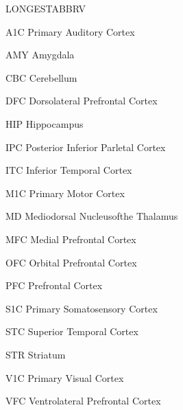 \begin{theglossary}{LONGESTABBRV}

\item[A1C] Primary Auditory Cortex
\item[AMY] Amygdala
\item[CBC] Cerebellum
\item[DFC] Dorsolateral Prefrontal Cortex
\item[HIP] Hippocampus
\item[IPC] Posterior Inferior Parletal Cortex
\item[ITC] Inferior Temporal Cortex
\item[M1C] Primary Motor Cortex
\item[MD] Mediodorsal Nucleusofthe Thalamus
\item[MFC] Medial Prefrontal Cortex
\item[OFC] Orbital Prefrontal Cortex
\item[PFC] Prefrontal Cortex
\item[S1C] Primary Somatosensory Cortex
\item[STC] Superior Temporal Cortex
\item[STR] Striatum
\item[V1C] Primary Visual Cortex
\item[VFC] Ventrolateral Prefrontal Cortex

\end{theglossary}
